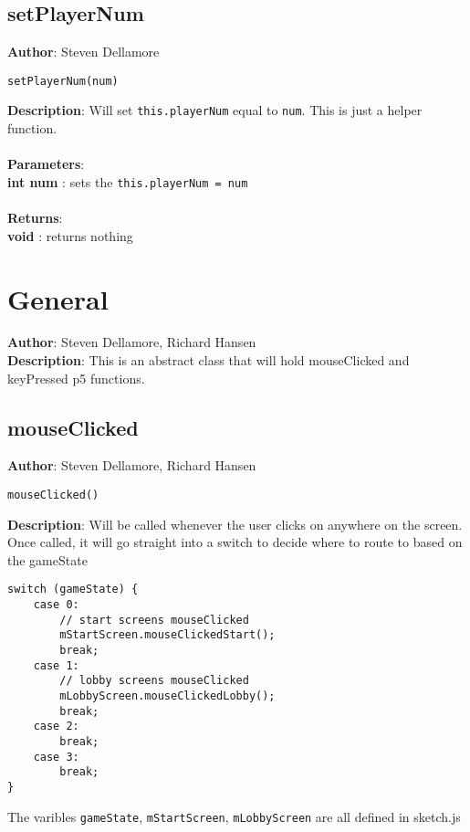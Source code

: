 \documentclass[12pt]{article}
\begin{document}
\subsection{setPlayerNum}
\textbf{Author}: Steven Dellamore 
\vspace*{1\baselineskip}
\begin{lstlisting}
setPlayerNum(num)
\end{lstlisting} 
\vspace*{1\baselineskip}
\textbf{Description}: Will set \texttt{this.playerNum} equal to \texttt{num}. This is just a helper function. \\


\textbf{\large{\\Parameters}}:\\
\textbf{int num }: sets the \texttt{this.playerNum = num}\\\textbf{\large{\\Returns}}:\\\textbf{void }: returns nothing

\section{General}
\textbf{Author}: Steven Dellamore, Richard Hansen \\
\textbf{Description}: This is an abstract class that will hold mouseClicked and keyPressed p5 functions. \\



\subsection{mouseClicked}
\textbf{Author}: Steven Dellamore, Richard Hansen 
\vspace*{1\baselineskip}
\begin{lstlisting}
mouseClicked()
\end{lstlisting} 
\vspace*{1\baselineskip}
\textbf{Description}: Will be called whenever the user clicks on anywhere on the screen. Once called, it will go straight into a switch to decide where to route to based on the gameState 
\begin{verbatim}
switch (gameState) {
    case 0:
        // start screens mouseClicked
        mStartScreen.mouseClickedStart(); 
        break;
    case 1:
        // lobby screens mouseClicked
        mLobbyScreen.mouseClickedLobby();
        break;
    case 2:
        break;
    case 3:
        break;
}
\end{verbatim}
 The varibles \texttt{gameState}, \texttt{mStartScreen}, \texttt{mLobbyScreen} are all defined in sketch.js \\
\end{document}
